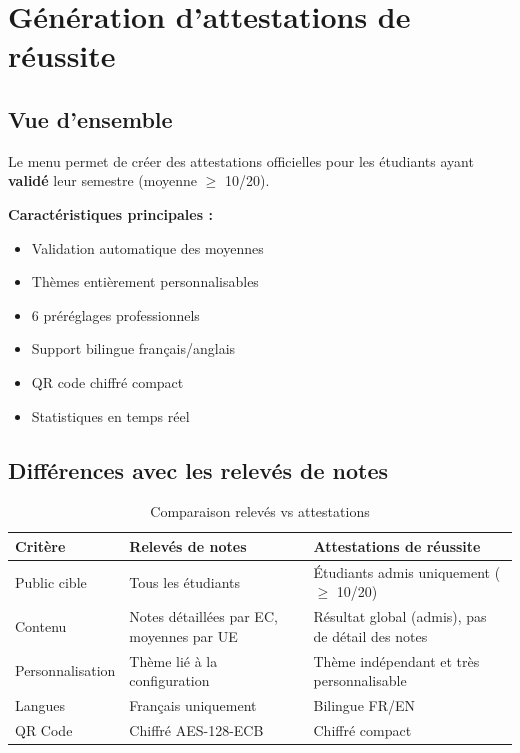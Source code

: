\section{Génération d'attestations de réussite}

\subsection{Vue d'ensemble}

Le menu  permet de créer des attestations officielles pour les étudiants ayant \textbf{validé} leur semestre (moyenne $\geq$ 10/20).


\textbf{Caractéristiques principales :}
\begin{itemize}[leftmargin=*]
    \item Validation automatique des moyennes
    \item Thèmes entièrement personnalisables
    \item 6 préréglages professionnels
    \item Support bilingue français/anglais
    \item QR code chiffré compact
    \item Statistiques en temps réel
\end{itemize}

\subsection{Différences avec les relevés de notes}

\begin{table}[h]
\centering
\begin{tabular}{|l|p{5.5cm}|p{5.5cm}|}
\hline
\textbf{Critère} & \textbf{Relevés de notes} & \textbf{Attestations de réussite} \\
\hline
Public cible & Tous les étudiants & Étudiants admis uniquement ($\geq$ 10/20) \\
\hline
Contenu & Notes détaillées par EC, moyennes par UE & Résultat global (admis), pas de détail des notes \\
\hline
Personnalisation & Thème lié à la configuration & Thème indépendant et très personnalisable \\
\hline
Langues & Français uniquement & Bilingue FR/EN \\
\hline
QR Code & Chiffré AES-128-ECB & Chiffré compact \\
\hline
\end{tabular}
\caption{Comparaison relevés vs attestations}
\end{table}

